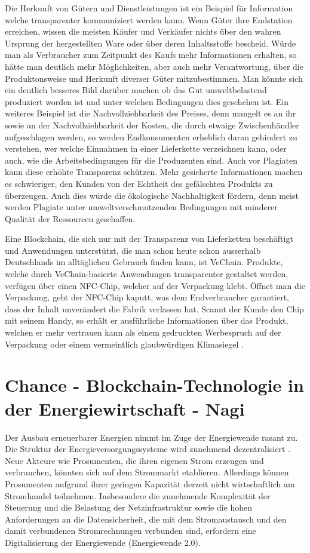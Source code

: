   Die Herkunft von Gütern und Dienstleistungen ist ein Beispiel für Information welche transparenter kommuniziert werden kann. Wenn Güter ihre Endstation erreichen, wissen die meisten Käufer und Verkäufer nichts über den wahren Ursprung der hergestellten Ware oder über deren Inhaltsstoffe bescheid. Würde man als Verbraucher zum Zeitpunkt des Kaufs mehr Informationen erhalten, so hätte man deutlich mehr Möglichkeiten, aber auch mehr Verantwortung, über die Produktonsweise und Herkunft diverser Güter mitzubestimmen. Man könnte sich ein deutlich besseres Bild darüber machen ob das Gut umweltbelastend produziert worden ist und unter welchen Bedingungen dies geschehen ist. Ein weiteres Beispiel ist die Nachvollziehbarkeit des Preises, denn mangelt es an ihr sowie an der Nachvollziehbarkeit der Kosten, die durch etwaige Zwischenhändler aufgeschlagen werden, so werden Endkonsumenten erheblich daran gehindert zu verstehen, wer welche Einnahmen in einer Lieferkette verzeichnen kann, oder auch, wie die Arbeitsbedingungen für die Produzenten sind\cite{lieferkette}. Auch vor Plagiaten kann diese erhöhte Transparenz schützen. Mehr gesicherte Informationen machen es schwieriger, den Kunden von der Echtheit des gefälschten Produkts zu überzeugen. Auch dies würde die ökologische Nachhaltigkeit fördern, denn meist werden Plagiate unter umweltverschmutzenden Bedingungen mit minderer Qualität der Ressourcen geschaffen.

Eine Blockchain, die sich nur mit der Transparenz von Lieferketten beschäftigt und Anwendungen unterstützt, die man schon heute schon ausserhalb Deutschlands im alltäglichen Gebrauch finden kann, ist VeChain. Produkte, welche durch VeChain-basierte Anwendungen transparenter gestaltet werden, verfügen über einen NFC-Chip, welcher auf der Verpackung klebt. Öffnet man die Verpackung, geht der NFC-Chip kaputt, was dem Endverbraucher garantiert, dass der Inhalt unverändert die Fabrik verlassen hat. Scannt der Kunde den Chip mit seinem Handy, so erhält er ausführliche Informationen über das Produkt, welchen er mehr vertrauen kann als einem gedruckten Werbespruch auf der Verpackung oder einem vermeintlich glaubwürdigen Klimasiegel \cite{vechain}\cite{veDoc}.
\section{Chance - Blockchain-Technologie in der Energiewirtschaft - Nagi}
Der Ausbau erneuerbarer Energien nimmt im Zuge der Energiewende rasant zu. Die Struktur der Energieversorgungssysteme wird zunehmend dezentralisiert \cite{Baralex20} . Neue Akteure wie Prosumenten, die ihren eigenen Strom erzeugen und verbrauchen, könnten sich auf dem Strommarkt etablieren. Allerdings können Prosumenten aufgrund ihrer geringen Kapazität derzeit nicht wirtschaftlich am Stromhandel teilnehmen. Insbesondere die zunehmende Komplexität der Steuerung und die Belastung der Netzinfrastruktur sowie die hohen Anforderungen an die Datensicherheit, die mit dem Stromaustausch und den damit verbundenen Stromrechnungen verbunden sind, erfordern eine Digitalisierung der Energiewende (Energiewende 2.0).

